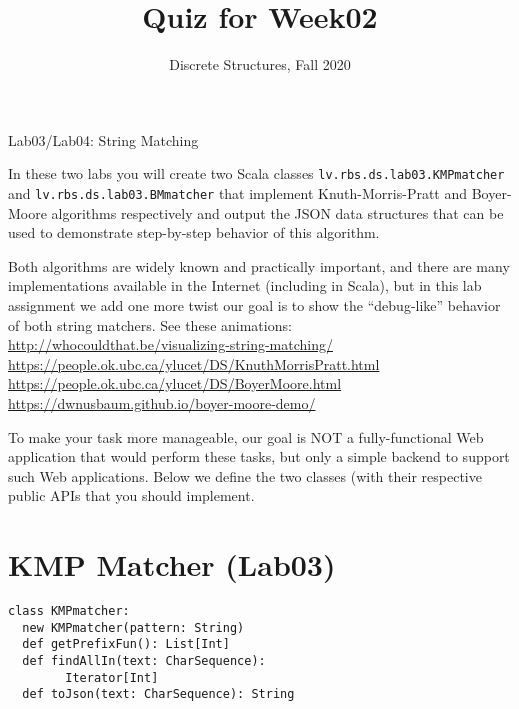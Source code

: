 \documentclass[jou]{apa6}
\title{Quiz for Week02}
\author{Discrete Structures, Fall 2020}
\affiliation{RBS}
\begin{document}

\twocolumn
{\Large Lab03/Lab04: String Matching}

\thispagestyle{empty}

In these two labs you will create two Scala classes {\tt lv.rbs.ds.lab03.KMPmatcher}
and {\tt lv.rbs.ds.lab03.BMmatcher} that implement Knuth-Morris-Pratt and 
Boyer-Moore algorithms respectively and output the JSON data structures
that can be used to demonstrate step-by-step behavior of this algorithm. 

Both algorithms are widely known and practically important, and there are many implementations available
in the Internet (including in Scala), but in this lab assignment we add 
one more twist \textendash{} our goal is to show the ``debug-like'' behavior of 
both string matchers. See these animations:\\ {\footnotesize
\url{http://whocouldthat.be/visualizing-string-matching/}\\
\url{https://people.ok.ubc.ca/ylucet/DS/KnuthMorrisPratt.html}\\
\url{https://people.ok.ubc.ca/ylucet/DS/BoyerMoore.html}\\
\url{https://dwnusbaum.github.io/boyer-moore-demo/} }

To make your task more manageable, our goal is NOT a fully-functional Web application
that would perform these tasks, but only a simple backend to support such Web applications. 
Below we define the two classes (with their respective public APIs that you should implement.

\section{KMP Matcher (Lab03)}

\begin{verbatim}
class KMPmatcher:
  new KMPmatcher(pattern: String)
  def getPrefixFun(): List[Int]
  def findAllIn(text: CharSequence): 
        Iterator[Int]
  def toJson(text: CharSequence): String
\end{verbatim}
\end{document}
